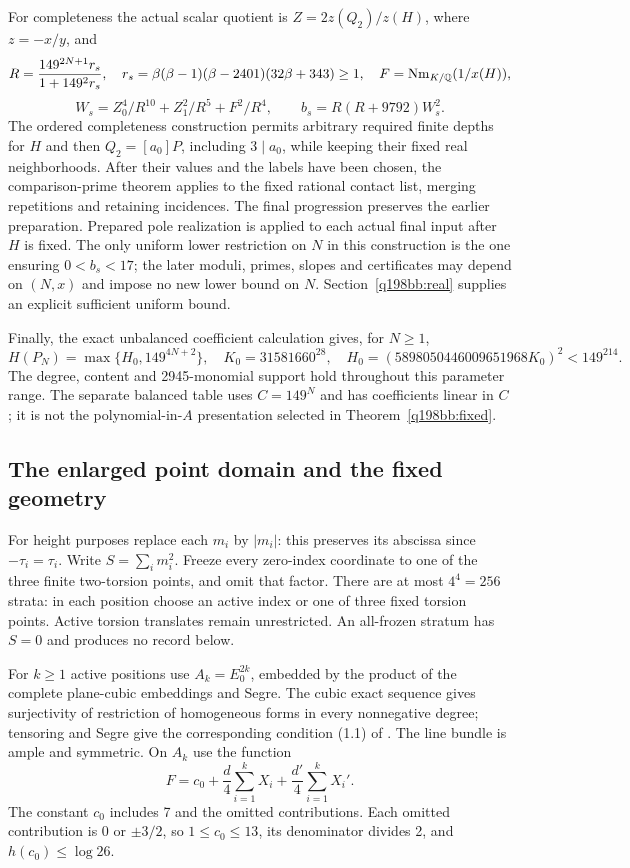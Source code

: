 For completeness the actual scalar quotient is
$Z=2z(Q_2)/z(H)$, where $z=-x/y$, and
\[
 R=\frac{149^{2N+1}r_s}{1+149^2r_s},\quad
 r_s=\beta(\beta-1)(\beta-2401)(32\beta+343)\ge1,
 \quad F=\operatorname{Nm}_{K/\mathbb Q}(1/x(H)),
\]
\[
 W_s=Z_0^4/R^{10}+Z_1^2/R^5+F^2/R^4,\qquad
 b_s=R(R+9792)W_s^2.
\]
The ordered completeness construction permits arbitrary required
finite depths for $H$ and then $Q_2=[a_0]P$, including $3\mid a_0$,
while keeping their fixed real neighborhoods. After their values and the
labels have been chosen, the comparison-prime theorem applies to the
fixed rational contact list, merging repetitions and retaining incidences.
The final progression preserves the earlier preparation. Prepared pole
realization is applied to each actual final input after $H$ is fixed.
The only uniform lower restriction on $N$ in this construction is the
one ensuring $0<b_s<17$; the later moduli, primes, slopes and certificates
may depend on $(N,x)$ and impose no new lower bound on $N$.
Section~\ref{q198bb:real} supplies an explicit sufficient uniform bound.

Finally, the exact unbalanced coefficient calculation gives, for $N\ge1$,
\[
 H(P_N)=\max\{H_0,149^{4N+2}\},\quad
 K_0=31581660^{28},\quad
 H_0=(5898050446009651968K_0)^2<149^{214}.
\]
The degree, content and 2945-monomial support hold throughout this
parameter range. The separate balanced table uses $C=149^N$ and has
coefficients linear in $C$; it is not the polynomial-in-$A$ presentation
selected in Theorem~\ref{q198bb:fixed}.

\subsection{The enlarged point domain and the fixed geometry}
\label{q198bb:geometry}
For height purposes replace each $m_i$ by $|m_i|$: this preserves its
abscissa since $-\tau_i=\tau_i$. Write
$S=\sum_i m_i^2$. Freeze every zero-index coordinate to one of the three
finite two-torsion points, and omit that factor. There are at most
$4^4=256$ strata: in each position choose an active index or one of three
fixed torsion points. Active torsion translates remain unrestricted.
An all-frozen stratum has $S=0$ and produces no record below.

For $k\ge1$ active positions use $A_k=E_0^{2k}$, embedded by the product
of the complete plane-cubic embeddings and Segre. The cubic exact
sequence gives surjectivity of restriction of homogeneous forms in
every nonnegative degree; tensoring and Segre give the corresponding
condition (1.1) of \cite{q198bb:VB}. The line bundle is ample and
symmetric. On $A_k$ use the function
\[
 F=c_0+\frac d4\sum_{i=1}^kX_i+\frac {d'}4\sum_{i=1}^kX_i'.
\]
The constant $c_0$ includes 7 and the omitted contributions. Each omitted
contribution is $0$ or $\pm3/2$, so $1\le c_0\le13$, its denominator
divides 2, and $h(c_0)\le\log26$.

